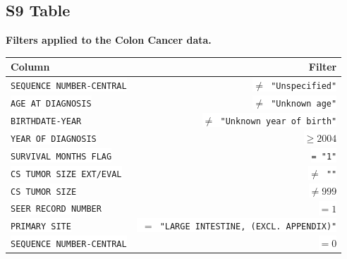 \documentclass[10pt,letterpaper]{article}
\newcommand{\codewhite}[1]{\colorbox{white}{\texttt{#1}}}
\begin{document}
\subsection*{S9 Table}
\label{S9_Table}
{\bf Filters applied to the Colon Cancer data.}
\begin{table}[H]
\begin{adjustwidth}{-2.25in}{0in} %
\begin{tabular}{lr}
\toprule
 Column &  Filter \\
\midrule
\codewhite{SEQUENCE NUMBER-CENTRAL} & \codewhite{$\neq$ "Unspecified"} \\
\codewhite{AGE AT DIAGNOSIS} & \codewhite{$\neq$ "Unknown age"} \\
\codewhite{BIRTHDATE-YEAR} & \codewhite{$\neq$ "Unknown year of birth"} \\
\codewhite{YEAR OF DIAGNOSIS} & \codewhite{$\geq 2004$} \\
\codewhite{SURVIVAL MONTHS FLAG} & \codewhite{= "1"}\\
\codewhite{CS TUMOR SIZE EXT/EVAL} & \codewhite{$\neq$ ""} \\
\codewhite{CS TUMOR SIZE} & \codewhite{$\neq 999$} \\
\codewhite{SEER RECORD NUMBER} & \codewhite{$= 1$} \\
\codewhite{PRIMARY SITE} & \codewhite{ $=$ "LARGE INTESTINE, (EXCL. APPENDIX)"} \\
\codewhite{SEQUENCE NUMBER-CENTRAL} & \codewhite{$=0$} \\
\bottomrule
\end{tabular}
\end{adjustwidth}
\end{table}
\end{document}
